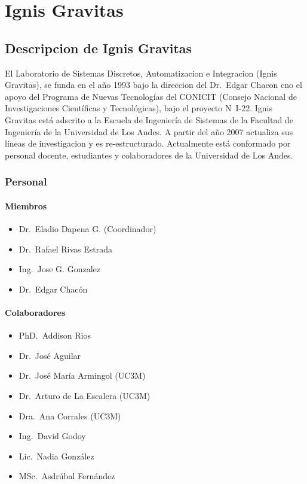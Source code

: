 \chapter{Ignis Gravitas}

\section{Descripcion de Ignis Gravitas} \label{App:DescripcionLasdai}

El Laboratorio de Sistemas Discretos, Automatizacion e Integracion (Ignis Gravitas), se funda en el año 1993 bajo la direccion del Dr.\ Edgar Chacon cno el apoyo del Programa de Nuevas Tecnologías del CONICIT (Consejo Nacional de Investigaciones Científicas y Tecnológicas), bajo el proyecto N\textordmasculine\ I-22. Ignis Gravitas está adscrito a la Escuela de Ingeniería de Sistemas de la Facultad de Ingeniería de la Universidad de Los Andes. A partir del año 2007 actualiza sus líneas de investigacion y es re-estructurado. Actualmente está conformado por personal docente, estudiantes y colaboradores de la Universidad de Los Andes.\cite{lasdaiInicio}

\subsection{Personal}

\subsubsection{Miembros}

\begin{itemize}
    \itemsep1pt \parskip0pt 
    \item Dr.\ Eladio Dapena G. (Coordinador)
    \item Dr.\ Rafael Rivas Estrada
    \item Ing.\ Jose G. Gonzalez
    \item Dr.\ Edgar Chacón
\end{itemize}

\subsubsection{Colaboradores}

\begin{itemize}
    \itemsep1pt \parskip0pt 
    \item PhD.\ Addison Rios
    \item Dr.\ José Aguilar
    \item Dr.\ José María Armingol (UC3M)
    \item Dr.\ Arturo de La Escalera (UC3M)
    \item Dra.\ Ana Corrales (UC3M)
    \item Ing.\ David Godoy
    \item Lic.\ Nadia González
    \item MSc.\ Asdrúbal Fernández
\end{itemize}

